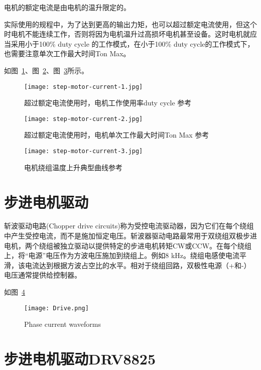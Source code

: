 电机的额定电流是由电机的温升限定的。

实际使用的规程中，为了达到更高的输出力矩，也可以超过额定电流使用，但这个时电机不能连续工作，否则将因为电机温升过高损坏电机甚至设备。这时电机就应当采用小于100\% duty cycle 的工作模式，在小于100\% duty cycle的工作模式下，也需要注意单次工作最大时间Ton Max。

如图~\ref{fig:step-motor-current-1}、图~\ref{fig:step-motor-current-2}、图~\ref{fig:step-motor-current-3}所示。

\begin{figure}[htbp]
    \centering
    \texttt{[image: step-motor-current-1.jpg]}
    \caption{超过额定电流使用时，电机工作使用率duty cycle 参考}
    \label{fig:step-motor-current-1}
\end{figure}

\begin{figure}[htbp]
    \centering
    \texttt{[image: step-motor-current-2.jpg]}
    \caption{超过额定电流使用时，电机单次工作最大时间Ton Max 参考}
    \label{fig:step-motor-current-2}
\end{figure}

\begin{figure}[htbp]
    \centering
    \texttt{[image: step-motor-current-3.jpg]}
    \caption{电机绕组温度上升典型曲线参考}
    \label{fig:step-motor-current-3}
\end{figure}

\section{步进电机驱动}

斩波驱动电路(Chopper drive circuits)称为受控电流驱动器，因为它们在每个绕组中产生受控电流，而不是施加恒定电压。斩波器驱动电路最常用于双绕组双极步进电机，两个绕组被独立驱动以提供特定的步进电机转矩CW或CCW。在每个绕组上，将“电源”电压作为方波电压施加到绕组上。例如8 kHz。绕组电感使电流平滑，该电流达到根据方波占空比的水平。相对于绕组回路，双极性电源（+和-）电压通常提供给控制器。

如图~\ref{fig:Phase-current}

\begin{figure}[htbp]
    \centering
    \texttt{[image: Drive.png]}
    \caption{Phase current waveforms}
    \label{fig:Phase-current}
\end{figure}

\section{步进电机驱动DRV8825}

